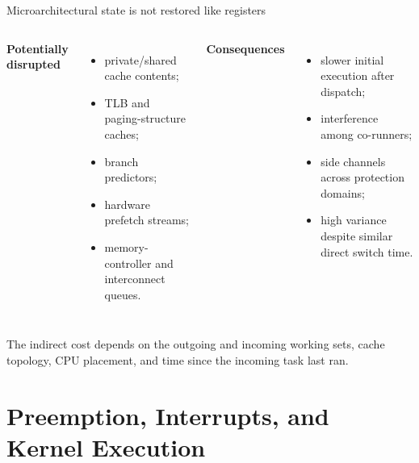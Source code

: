 \documentclass[aspectratio=169,11pt]{beamer}
\begin{document}
\begin{frame}{Microarchitectural state is not restored like registers}
  \begin{columns}[T,onlytextwidth]
      \textbf{Potentially disrupted}
      \begin{itemize}
        \item private/shared cache contents;
        \item TLB and paging-structure caches;
        \item branch predictors;
        \item hardware prefetch streams;
        \item memory-controller and interconnect queues.
      \end{itemize}
      \textbf{Consequences}
      \begin{itemize}
        \item slower initial execution after dispatch;
        \item interference among co-runners;
        \item side channels across protection domains;
        \item high variance despite similar direct switch time.
      \end{itemize}
  \end{columns}
  \begin{tcolorbox}[title=Working-set principle]
    The indirect cost depends on the outgoing and incoming working sets, cache topology, CPU placement, and time since the incoming task last ran.
  \end{tcolorbox}
\end{frame}

\section{Preemption, Interrupts, and Kernel Execution}
\end{document}

